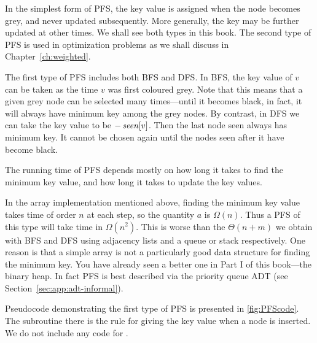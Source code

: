 In the simplest form of PFS, the key value is assigned when the node
becomes grey, and never updated subsequently. More generally, the key
may be further updated at other times. We shall see both types in this
book. The second type of PFS is used in optimization problems as we
shall discuss in Chapter~\ref{ch:weighted}. 

The first type of PFS includes both BFS and DFS. In BFS, the key
value of $v$ can be taken as the time $v$ was first coloured grey.
Note that this means that a given grey node can be selected many
times---until it becomes black, in fact, it will always have minimum
key among the grey nodes. By contrast, in DFS we can take the key
value to be $-\operatorname{\text{\textit{seen}}}[v]$. Then the last node seen always has minimum
key. It cannot be chosen again until the nodes seen after it have
become black.

The running time of PFS depends mostly on how long it takes to find the
minimum key value, and how long it takes to update the key values.

In the array implementation mentioned above, finding the minimum key
value takes time of order $n$ at each step, so the quantity $a$ is
$\Omega(n)$. Thus a PFS of this type will take time in $\Omega(n^2)$.
This is worse than the $\Theta(n+m)$ we obtain with BFS and DFS using
adjacency lists and a queue or stack respectively. One reason is that a
simple array is not a particularly good data structure for finding the
minimum key. You have already seen a better one in Part I of this 
book---the binary heap. In fact PFS is best described via the priority
queue ADT (see Section~\ref{sec:app:adt-informal}).

Pseudocode demonstrating the first type of PFS is presented in
\cref{fig:PFScode}. The subroutine  there is the
rule for giving the key value when a node is inserted. We do not include
any code for .

